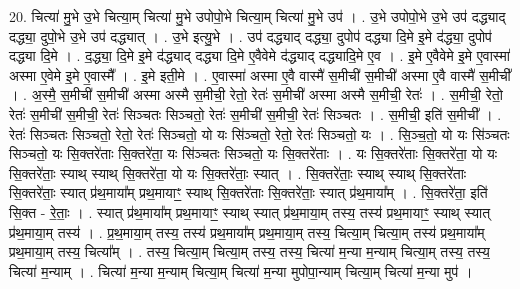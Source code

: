 \documentclass[17pt]{extarticle}
\begin{document}
20. चित्या॑ मु॒भे उ॒भे चित्या॒म् चित्या॑ मु॒भे उपोपो॒भे चित्या॒म् चित्या॑ मु॒भे उप॑ । . उ॒भे उपोपो॒भे उ॒भे उप॑ दद्ध्याद् दद्ध्या॒ दुपो॒भे उ॒भे उप॑ दद्ध्यात् । . उ॒भे इत्यु॒भे । . उप॑ दद्ध्याद् दद्ध्या॒ दुपोप॑ दद्ध्या दि॒मे इ॒मे द॑द्ध्या॒ दुपोप॑ दद्ध्या दि॒मे । . द॒द्ध्या॒ दि॒मे इ॒मे द॑द्ध्याद् दद्ध्या दि॒मे ए॒वैवेमे द॑द्ध्याद् दद्ध्यादि॒मे ए॒व । . इ॒मे ए॒वैवेमे इ॒मे ए॒वास्मा॑ अस्मा ए॒वेमे इ॒मे ए॒वास्मै᳚ । . इ॒मे इती॒मे । . ए॒वास्मा॑ अस्मा ए॒वै वास्मै॑ स॒मीची॑ स॒मीची॑ अस्मा ए॒वै वास्मै॑ स॒मीची᳚ । . अ॒स्मै॒ स॒मीची॑ स॒मीची॑ अस्मा अस्मै स॒मीची॒ रेतो॒ रेतः॑ स॒मीची॑ अस्मा अस्मै स॒मीची॒ रेतः॑ । . स॒मीची॒ रेतो॒ रेतः॑ स॒मीची॑ स॒मीची॒ रेतः॑ सिञ्चतः सिञ्चतो॒ रेतः॑ स॒मीची॑ स॒मीची॒ रेतः॑ सिञ्चतः । . स॒मीची॒ इति॑ स॒मीची᳚ । . रेतः॑ सिञ्चतः सिञ्चतो॒ रेतो॒ रेतः॑ सिञ्चतो॒ यो यः सि॑ञ्चतो॒ रेतो॒ रेतः॑ सिञ्चतो॒ यः । . सि॒ञ्च॒तो॒ यो यः सि॑ञ्चतः सिञ्चतो॒ यः सि॒क्तरे॑ताः सि॒क्तरे॑ता॒ यः सि॑ञ्चतः सिञ्चतो॒ यः सि॒क्तरे॑ताः । . यः सि॒क्तरे॑ताः सि॒क्तरे॑ता॒ यो यः सि॒क्तरे॑ताः॒ स्याथ् स्याथ् सि॒क्तरे॑ता॒ यो यः सि॒क्तरे॑ताः॒ स्यात् । . सि॒क्तरे॑ताः॒ स्याथ् स्याथ् सि॒क्तरे॑ताः सि॒क्तरे॑ताः॒ स्यात् प्र॑थ॒माया᳚म् प्रथ॒मायाꣳ॒॒ स्याथ् सि॒क्तरे॑ताः सि॒क्तरे॑ताः॒ स्यात् प्र॑थ॒माया᳚म् । . सि॒क्तरे॑ता॒ इति॑ सि॒क्त - रे॒ताः॒ । . स्यात् प्र॑थ॒माया᳚म् प्रथ॒मायाꣳ॒॒ स्याथ् स्यात् प्र॑थ॒माया॒म् तस्य॒ तस्य॑ प्रथ॒मायाꣳ॒॒ स्याथ् स्यात् प्र॑थ॒माया॒म् तस्य॑ । . प्र॒थ॒माया॒म् तस्य॒ तस्य॑ प्रथ॒माया᳚म् प्रथ॒माया॒म् तस्य॒ चित्या॒म् चित्या॒म् तस्य॑ प्रथ॒माया᳚म् प्रथ॒माया॒म् तस्य॒ चित्या᳚म् । . तस्य॒ चित्या॒म् चित्या॒म् तस्य॒ तस्य॒ चित्या॑ म॒न्या म॒न्याम् चित्या॒म् तस्य॒ तस्य॒ चित्या॑ म॒न्याम् । . चित्या॑ म॒न्या म॒न्याम् चित्या॒म् चित्या॑ म॒न्या मुपोपा॒न्याम् चित्या॒म् चित्या॑ म॒न्या मुप॑ । \newline
\end{document}

